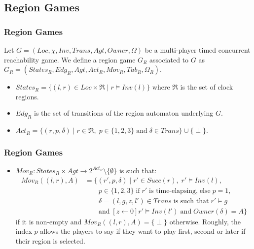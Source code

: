 \documentclass{beamer}
\begin{document}
\subsection*{Region Games}
\begin{frame}
\frametitle{Region Games}
\begin{definition}
Let $G = (Loc, \chi, Inv, Trans, Agt, Owner, \Omega)$ be a multi-player timed concurrent reachability game. We define a region game $G_{R}$ associated to $G$ as $G_{R} = (States_{R}, Edg_{R}, Agt, Act_{R}, Mov_{R}, Tab_{R}, \Omega_{R})$.
\end{definition}
  \begin{itemize}
	\item $States_{R} = \lbrace (l, r) \in Loc \times \Re \; \vert \; r \models Inv(l) \rbrace$ where $\Re$ is the set of clock regions.
 	\item $Edg_{R}$ is the set of transitions of the region automaton underlying $G$.
 	\item $Act_{R} = \lbrace (r, p, \delta) \; \vert \; r \in \Re, \; p \in \lbrace 1, 2, 3 \rbrace \; \text{and} \; \delta \in Trans \rbrace \cup \lbrace \perp \rbrace$.
  \end{itemize}
\end{frame}

\begin{frame}
\frametitle{Region Games}
  \begin{itemize}
\item $Mov_{R}: States_{R} \times Agt \rightarrow 2^{Act_{R}} \setminus \lbrace \emptyset \rbrace$ is such that:
\begin{align*}
Mov_{R}((l, r), A) &= \Big\lbrace (r', p, \delta) \; \Big\vert \; r' \in Succ(r), \; r' \models Inv(l),\\
&\qquad p \in \lbrace 1, 2, 3 \rbrace \; \text{if} \; r' \; \text{is time-elapsing,} \; \text{else} \; p = 1,\\
&\qquad \delta = (l, g, z, l') \in Trans \; \text{is such that} \; r' \models g\\
&\qquad \text{and} \; [z \leftarrow 0]r' \models Inv(l') \; \text{and} \; Owner(\delta) = A \Big\rbrace
\end{align*}
if it is non-empty and $Mov_{R}((l, r), A) = \lbrace \perp \rbrace$ otherwise. Roughly, the index $p$ allows the players to say if they want to play first, second or later if their region is selected.
  \end{itemize}
\end{frame}
\end{document}
